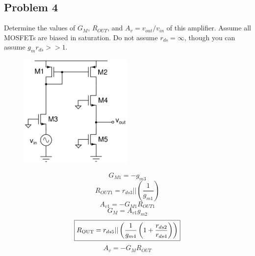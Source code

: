 \documentclass{article}
\begin{document}
\subsection*{Problem 4}
Determine the values of $G_M$, $R_{OUT}$, and $A_v = v_{out}/v_{in}$ of this amplifier.  Assume all MOSFETs are biased in saturation.  Do not assume $r_{ds} = \infty$, though you can assume $g_mr_{ds} >> 1$.
\begin{figure}[!h]
\begin{center}
    \includegraphics[width=0.5\textwidth]{figures/cc_amp_4.png}
\end{center}
\end{figure}
$$G_{M1} = -g_{m3}$$
$$R_{OUT1} = r_{ds3} || \left(\frac{1}{g_{m1}}\right)$$
$${A_{v1} = -G_{M1}R_{OUT1}}$$
$$\boxed{G_{M} = A_{v1}g_{m2}}$$
$$\boxed{R_{\rm OUT} = r_{ds5} || \left(\frac{1}{g_{m4}}\left(1 + \frac{r_{ds2}}{r_{ds4}}\right)\right)}$$
$$\boxed{A_{v} = -G_{M}R_{OUT}}$$
\newpage
\end{document}
